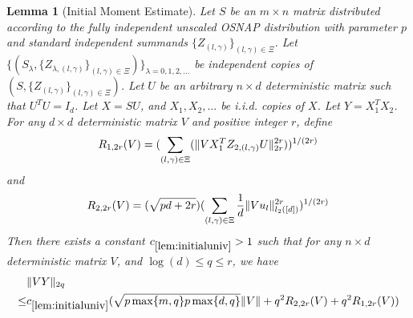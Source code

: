 \documentclass[11pt]{amsart}
\numberwithin{equation}{section}
\numberwithin{equation}{section}
\DeclarePairedDelimiter{\norm}{\lVert}{\rVert}
\newtheorem{lemma}[theorem]{Lemma}
\begin{document}
\begin{lemma}[Initial Moment Estimate]\label{lem:initialuniv}
Let $S$ be an $m \times n$ matrix distributed according to the fully independent unscaled OSNAP distribution with parameter $p$ and standard independent summands $\{Z_{(l,\gamma)}\}_{(l,\gamma) \in \Xi}$. Let $\{(S_{\lambda},\{Z_{\lambda,(l,\gamma)}\}_{(l,\gamma) \in \Xi})\}_{\lambda=0,1,2,...}$ be independent copies of $(S,\{Z_{(l,\gamma)}\}_{(l,\gamma) \in \Xi})$. Let $U$ be an arbitrary $n \times d$ deterministic matrix such that $U^TU=I_d$.
Let $X=SU$, and $X_1,X_2,...$ be i.i.d. copies of $X$. Let $Y=X_{1}^TX_{2}$. For any $d \times d$ deterministic matrix $V$ and positive integer $r$, define
\begin{align*}
    R_{1,2r}(V)=(\sum\limits_{(l,\gamma) \in \Xi}(\norm{VX_1^TZ_{2,(l,\gamma)}U}_{2r}^{2r}))^{1/(2r)}
\end{align*}
and
\begin{align*}
    R_{2,2r}(V)=(\sqrt{pd+2r}) (\sum\limits_{(l,\gamma) \in \Xi}\frac{1}{d}\norm{Vu_l}_{l_2([d])}^{2r})^{1/(2r)}
\end{align*}
Then there exists a constant $c_{\ref{lem:initialuniv}}>1$ such that for any $n \times d$ deterministic matrix $V$, and $\log(d) \le q \le r$, we have
\begin{equation}\label{eq:initmom}
    \begin{aligned}
    &\norm{VY}_{2q} \\\le&  c_{\ref{lem:initialuniv}}(\sqrt{p\max\{m,q\}p\max\{d,q\}}\norm{V} + q^{2}R_{2,2r}(V) + q^{2}R_{1,2r}(V))
\end{aligned}
\end{equation}


\end{lemma}
\end{document}
